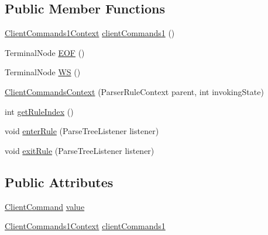 \subsection*{Public Member Functions}
\begin{DoxyCompactItemize}
\item 
\hyperlink{classgov_1_1nasa_1_1jpf_1_1inspector_1_1client_1_1parser_1_1_console_grammar_parser_1_1_client_commands1_context}{Client\+Commands1\+Context} \hyperlink{classgov_1_1nasa_1_1jpf_1_1inspector_1_1client_1_1parser_1_1_console_grammar_parser_1_1_client_commands_context_a9dd23ed16c9924a3df14c94cf56a153d}{client\+Commands1} ()
\item 
Terminal\+Node \hyperlink{classgov_1_1nasa_1_1jpf_1_1inspector_1_1client_1_1parser_1_1_console_grammar_parser_1_1_client_commands_context_a7a3fc39e4b0cf066d8a68aa25a869aad}{E\+OF} ()
\item 
Terminal\+Node \hyperlink{classgov_1_1nasa_1_1jpf_1_1inspector_1_1client_1_1parser_1_1_console_grammar_parser_1_1_client_commands_context_a7d3ba6af3047add263bf68a12dff2bbc}{WS} ()
\item 
\hyperlink{classgov_1_1nasa_1_1jpf_1_1inspector_1_1client_1_1parser_1_1_console_grammar_parser_1_1_client_commands_context_a3501677e182a97e6534844483bdb47d3}{Client\+Commands\+Context} (Parser\+Rule\+Context parent, int invoking\+State)
\item 
int \hyperlink{classgov_1_1nasa_1_1jpf_1_1inspector_1_1client_1_1parser_1_1_console_grammar_parser_1_1_client_commands_context_a02bc7401bd4d8d4015f33270b8ea2193}{get\+Rule\+Index} ()
\item 
void \hyperlink{classgov_1_1nasa_1_1jpf_1_1inspector_1_1client_1_1parser_1_1_console_grammar_parser_1_1_client_commands_context_a1fab21338d66d07889783e95843e48a9}{enter\+Rule} (Parse\+Tree\+Listener listener)
\item 
void \hyperlink{classgov_1_1nasa_1_1jpf_1_1inspector_1_1client_1_1parser_1_1_console_grammar_parser_1_1_client_commands_context_ac750875c1893eb14b7c350f7f838d3bb}{exit\+Rule} (Parse\+Tree\+Listener listener)
\end{DoxyCompactItemize}
\subsection*{Public Attributes}
\begin{DoxyCompactItemize}
\item 
\hyperlink{classgov_1_1nasa_1_1jpf_1_1inspector_1_1client_1_1_client_command}{Client\+Command} \hyperlink{classgov_1_1nasa_1_1jpf_1_1inspector_1_1client_1_1parser_1_1_console_grammar_parser_1_1_client_commands_context_a2cc5d4582fb6cb387ace3a214eaba754}{value}
\item 
\hyperlink{classgov_1_1nasa_1_1jpf_1_1inspector_1_1client_1_1parser_1_1_console_grammar_parser_1_1_client_commands1_context}{Client\+Commands1\+Context} \hyperlink{classgov_1_1nasa_1_1jpf_1_1inspector_1_1client_1_1parser_1_1_console_grammar_parser_1_1_client_commands_context_add971128de40ca0550c20ba36e900764}{client\+Commands1}
\end{DoxyCompactItemize}



